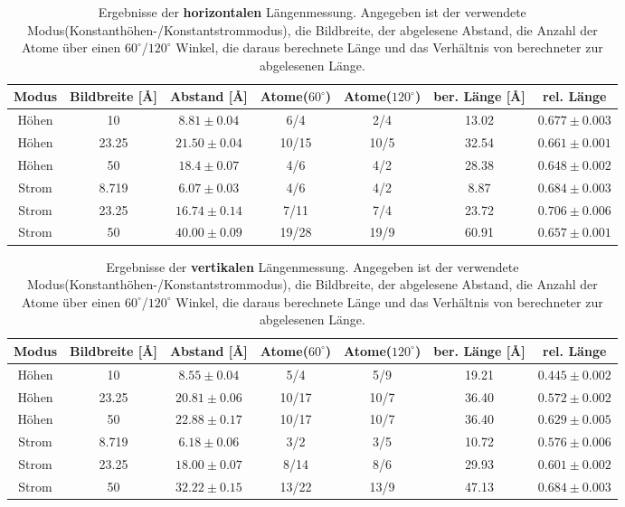 \documentclass[12pt,a4paper]{article}
\begin{document}
\begin{table}
\begin{tabular}{|c|c|c||c|c||c|c|}
\hline 
Modus & Bildbreite [\si{\angstrom}] & Abstand [\si{\angstrom}] & Atome($60^{\circ}$) & Atome($120^{\circ}$) & ber. Länge [\si{\angstrom}] & rel. Länge\\ 
\hline 
\hline 
Höhen & 10 & $8.81\pm 0.04$ & 6/4 & 2/4 & 13.02& $0.677\pm 0.003$\\ 
\hline 
Höhen & 23.25 & $21.50\pm 0.04$ & 10/15 & 10/5 & 32.54& $0.661\pm 0.001$\\ 
\hline 
Höhen & 50 & $18.4\pm 0.07$ & 4/6  & 4/2 & 28.38& $0.648\pm 0.002$\\ 
\hline 
\hline
Strom & 8.719 & $6.07\pm 0.03$ & 4/6 & 4/2 & 8.87& $0.684\pm 0.003$\\ 
\hline 
Strom & 23.25 & $16.74\pm 0.14$ & 7/11  & 7/4 & 23.72& $0.706\pm 0.006$\\ 
\hline 
Strom & 50 & $40.00\pm 0.09$ & 19/28  & 19/9 & 60.91& $0.657\pm 0.001$\\ 
\hline 
\end{tabular} 
\caption{Ergebnisse der \textbf{horizontalen} Längenmessung. Angegeben ist der verwendete Modus(Konstanthöhen-/Konstantstrommodus), die Bildbreite, der abgelesene Abstand, die Anzahl der Atome über einen $60^{\circ}$/$120^{\circ}$ Winkel, die daraus berechnete Länge und das Verhältnis von berechneter zur abgelesenen Länge.}
\label{tab:Atome_horizontal}
\end{table}

\begin{table}
\begin{tabular}{|c|c|c||c|c||c|c|}
\hline 
Modus & Bildbreite [\si{\angstrom}]  & Abstand [\si{\angstrom}] & Atome($60^{\circ}$) & Atome($120^{\circ}$) & ber. Länge [\si{\angstrom}] & rel. Länge\\ 
\hline 
\hline 
Höhen & 10 & $8.55\pm 0.04$ & 5/4 & 5/9 & 19.21& $0.445\pm 0.002$\\ 
\hline 
Höhen & 23.25 & $20.81\pm 0.06$ & 10/17  & 10/7 & 36.40& $0.572\pm 0.002$\\ 
\hline 
Höhen & 50 & $22.88\pm 0.17$ & 10/17  & 10/7 & 36.40& $0.629\pm 0.005$\\ 
\hline 
\hline 
Strom & 8.719 & $6.18\pm 0.06$ & 3/2 & 3/5 & 10.72& $0.576\pm 0.006$\\
\hline 
Strom & 23.25 & $18.00\pm 0.07$ & 8/14  & 8/6 & 29.93& $0.601\pm 0.002$\\
\hline 
Strom & 50 & $32.22\pm 0.15$ & 13/22  & 13/9 & 47.13& $0.684\pm 0.003$\\
\hline 
\end{tabular} 
\caption{Ergebnisse der \textbf{vertikalen} Längenmessung. Angegeben ist der verwendete Modus(Konstanthöhen-/Konstantstrommodus), die Bildbreite, der abgelesene Abstand, die Anzahl der Atome über einen $60^{\circ}$/$120^{\circ}$ Winkel, die daraus berechnete Länge und das Verhältnis von berechneter zur abgelesenen Länge.}
\label{tab:Atome_vertikal}
\end{table}
\end{document}
